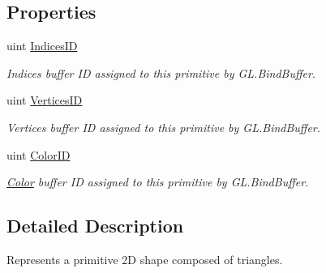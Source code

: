 \subsection*{Properties}
\begin{DoxyCompactItemize}
\item 
uint \hyperlink{class_tri_devs_1_1_tri_engine2_d_1_1_graphics_1_1_primitive_a0856124fa599dbb34e44169c331094a2}{Indices\-I\-D}
\begin{DoxyCompactList}\small\item\em Indices buffer I\-D assigned to this primitive by G\-L.\-Bind\-Buffer. \end{DoxyCompactList}\item 
uint \hyperlink{class_tri_devs_1_1_tri_engine2_d_1_1_graphics_1_1_primitive_acda37c3b5c83823f7299da2296a43cbd}{Vertices\-I\-D}
\begin{DoxyCompactList}\small\item\em Vertices buffer I\-D assigned to this primitive by G\-L.\-Bind\-Buffer. \end{DoxyCompactList}\item 
uint \hyperlink{class_tri_devs_1_1_tri_engine2_d_1_1_graphics_1_1_primitive_a15fdde8f790e57886741f6e885f0a043}{Color\-I\-D}
\begin{DoxyCompactList}\small\item\em \hyperlink{struct_tri_devs_1_1_tri_engine2_d_1_1_color}{Color} buffer I\-D assigned to this primitive by G\-L.\-Bind\-Buffer. \end{DoxyCompactList}\end{DoxyCompactItemize}


\subsection{Detailed Description}
Represents a primitive 2\-D shape composed of triangles. 




